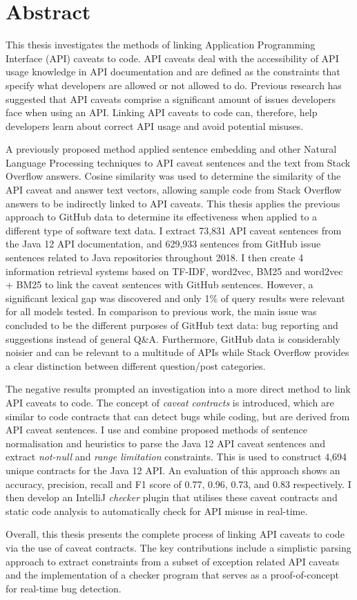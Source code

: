\chapter*{Abstract}
\vspace{-1em}
This thesis investigates the methods of linking Application Programming Interface (API) caveats to code. API caveats deal with the accessibility of API usage knowledge in API documentation and are defined as the constraints that specify what developers are allowed or not allowed to do. Previous research has suggested that API caveats comprise a significant amount of issues developers face when using an API. Linking API caveats to code can, therefore, help developers learn about correct API usage and avoid potential misuses.

A previously proposed method applied sentence embedding and other Natural Language Processing techniques to API caveat sentences and the text from Stack Overflow answers. Cosine similarity was used to determine the similarity of the API caveat and answer text vectors, allowing sample code from Stack Overflow answers to be indirectly linked to API caveats. This thesis applies the previous approach to GitHub data to determine its effectiveness when applied to a different type of software text data. I extract 73,831 API caveat sentences from the Java 12 API documentation, and 629,933 sentences from GitHub issue sentences related to Java repositories throughout 2018. I then create 4 information retrieval systems based on TF-IDF, word2vec, BM25 and word2vec + BM25 to link the caveat sentences with GitHub sentences. However, a significant lexical gap was discovered and only 1\% of query results were relevant for all models tested. In comparison to previous work, the main issue was concluded to be the different purposes of GitHub text data: bug reporting and suggestions instead of general Q\&A. Furthermore, GitHub data is considerably noisier and can be relevant to a multitude of APIs while Stack Overflow provides a clear distinction between different question/post categories. 

The negative results prompted an investigation into a more direct method to link API caveats to code. The concept of \textit{caveat contracts} is introduced, which are similar to code contracts that can detect bugs while coding, but are derived from API caveat sentences. I use and combine proposed methods of sentence normalisation and heuristics to parse the Java 12 API caveat sentences and extract \textit{not-null} and \textit{range limitation} constraints. This is used to construct 4,694 unique contracts for the Java 12 API. An evaluation of this approach shows an accuracy, precision, recall and F1 score of 0.77, 0.96, 0.73, and 0.83 respectively. I then develop an IntelliJ \textit{checker} plugin that utilises these caveat contracts and static code analysis to automatically check for API misuse in real-time.

Overall, this thesis presents the complete process of linking API caveats to code via the use of caveat contracts. The key contributions include a simplistic parsing approach to extract constraints from a subset of exception related API caveats and the implementation of a checker program that serves as a proof-of-concept for real-time bug detection.